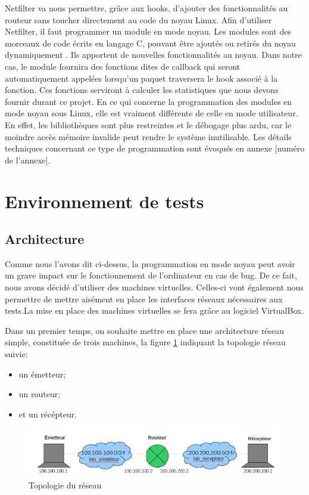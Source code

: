 \documentclass[a4paper]{article}
\begin{document}
Netfilter va nous permettre, grâce aux hooks, d'ajouter des fonctionnalités au routeur 
sans toucher directement au code du noyau Linux. Afin d'utiliser Netfilter, il faut 
programmer un module en mode noyau. Les modules sont des morceaux de code écrits en 
langage C, pouvant être ajoutés ou retirés du noyau dynamiquement \cite{module1}. Ils apportent de 
nouvelles fonctionnalités au noyau. Dans notre cas, le module fournira des fonctions 
dites de callback qui seront automatiquement appelées lorsqu'un paquet traversera le 
hook associé à la fonction. Ces fonctions serviront à calculer les statistiques que 
nous devons fournir durant ce projet.
En ce qui concerne la programmation des modules en mode noyau sous Linux, elle est 
vraiment différente de celle en mode utilisateur. En effet, les bibliothèques sont 
plus restreintes et le débogage plus ardu, car le moindre accès mémoire invalide peut 
rendre le système inutilisable. Les détails techniques concernant ce type de programmation 
sont évoqués en annexe [numéro de l'annexe].

\section{Environnement de tests}

\subsection{Architecture}

Comme nous l'avons dit ci-dessus, la programmation en mode noyau peut avoir un grave 
impact sur le fonctionnement de l'ordinateur en cas de bug. De ce fait, nous avons 
décidé d'utiliser des machines virtuelles. Celles-ci vont également nous permettre 
de mettre aisément en place les interfaces réseaux nécessaires aux tests.La mise en 
place des machines virtuelles se fera grâce au logiciel VirtualBox\cite{virtbox}.

Dans un premier temps, on souhaite mettre en place une
architecture réseau simple, constituée de trois machines, la
figure \ref{topo} indiquant la topologie réseau suivie:
\begin{itemize}
	\item un émetteur;
	\item un routeur;
	\item et un récépteur.
\end{itemize}

\begin{figure}[!ht]
	\centering
	\includegraphics[scale=.5]{topo.jpg}
	\caption{\label{topo} Topologie du réseau}
\end{figure}
\end{document}
